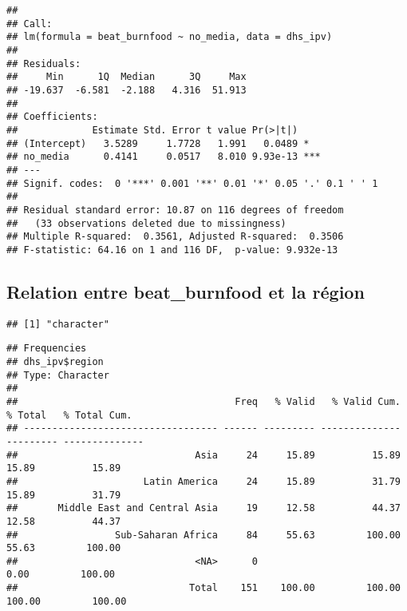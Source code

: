 \documentclass[
]{article}
\newenvironment{Shaded}{\begin{snugshade}}{\end{snugshade}}
\newcommand{\KeywordTok}[1]{\textcolor[rgb]{0.13,0.29,0.53}{\textbf{#1}}}
\newcommand{\NormalTok}[1]{#1}
\newcommand{\OperatorTok}[1]{\textcolor[rgb]{0.81,0.36,0.00}{\textbf{#1}}}
\begin{document}
\begin{verbatim}
## 
## Call:
## lm(formula = beat_burnfood ~ no_media, data = dhs_ipv)
## 
## Residuals:
##     Min      1Q  Median      3Q     Max 
## -19.637  -6.581  -2.188   4.316  51.913 
## 
## Coefficients:
##             Estimate Std. Error t value Pr(>|t|)    
## (Intercept)   3.5289     1.7728   1.991   0.0489 *  
## no_media      0.4141     0.0517   8.010 9.93e-13 ***
## ---
## Signif. codes:  0 '***' 0.001 '**' 0.01 '*' 0.05 '.' 0.1 ' ' 1
## 
## Residual standard error: 10.87 on 116 degrees of freedom
##   (33 observations deleted due to missingness)
## Multiple R-squared:  0.3561, Adjusted R-squared:  0.3506 
## F-statistic: 64.16 on 1 and 116 DF,  p-value: 9.932e-13
\end{verbatim}

\hypertarget{relation-entre-beat_burnfood-et-la-ruxe9gion}{%
\subsection{Relation entre beat\_burnfood et la
région}\label{relation-entre-beat_burnfood-et-la-ruxe9gion}}

\begin{Shaded}
\end{Shaded}

\begin{verbatim}
## [1] "character"
\end{verbatim}

\begin{Shaded}
\end{Shaded}

\begin{verbatim}
## Frequencies  
## dhs_ipv$region  
## Type: Character  
## 
##                                      Freq   % Valid   % Valid Cum.   % Total   % Total Cum.
## ---------------------------------- ------ --------- -------------- --------- --------------
##                               Asia     24     15.89          15.89     15.89          15.89
##                      Latin America     24     15.89          31.79     15.89          31.79
##       Middle East and Central Asia     19     12.58          44.37     12.58          44.37
##                 Sub-Saharan Africa     84     55.63         100.00     55.63         100.00
##                               <NA>      0                               0.00         100.00
##                              Total    151    100.00         100.00    100.00         100.00
\end{verbatim}
\end{document}
